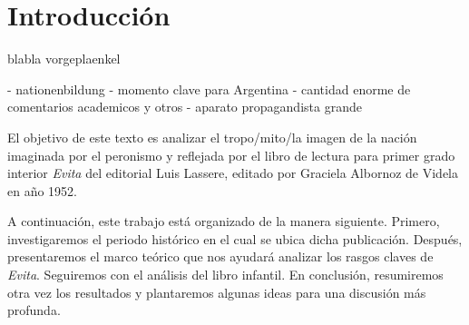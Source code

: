 \section{Introducción}
blabla vorgeplaenkel

- nationenbildung
- momento clave para Argentina
- cantidad enorme de comentarios academicos y otros
- aparato propagandista grande

El objetivo de este texto es analizar el tropo/mito/la imagen de la nación imaginada por el peronismo y reflejada por el libro de lectura para primer grado interior \textit{Evita} del editorial Luis Lassere, editado por Graciela Albornoz de Videla en año 1952.


A continuación, este trabajo está organizado de la manera siguiente.
Primero, investigaremos el periodo histórico en el cual se ubica dicha publicación.
Después, presentaremos el marco teórico que nos ayudará analizar los rasgos claves de \textit{Evita}.
Seguiremos con el análisis del libro infantil.
En conclusión, resumiremos otra vez los resultados y plantaremos algunas ideas para una discusión más profunda.
